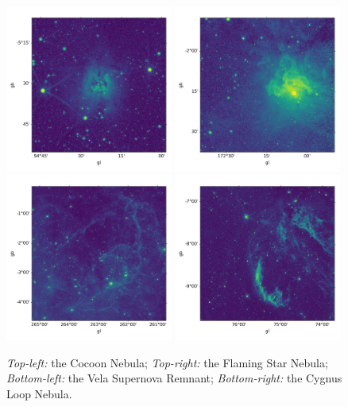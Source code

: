\documentclass[12pt, preprint]{aastex}
\begin{document}
\begin{figure}[p]
\begin{center}
\includegraphics[width=0.49\textwidth]{figures/cocoon}
\includegraphics[width=0.49\textwidth]{figures/FlamingStar}
\includegraphics[width=0.49\textwidth]{figures/vela}
\includegraphics[width=0.49\textwidth]{figures/cygnusloop}
\end{center}
\caption{
  \label{map1}
   \emph{Top-left:}  the Cocoon Nebula;
   \emph{Top-right:} the Flaming Star Nebula;
   \emph{Bottom-left:} the Vela Supernova Remnant;
   \emph{Bottom-right:} the Cygnus Loop Nebula.
}
\end{figure}
\end{document}
